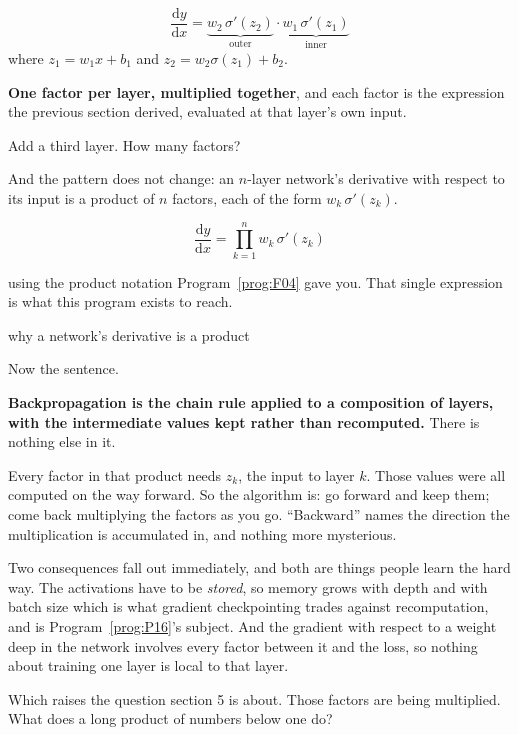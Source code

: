 \begin{fr}
\begin{ansblock}
\[ \frac{\mathrm{d}y}{\mathrm{d}x}
   = \underbrace{w_2\,\sigma'(z_2)}_{\text{outer}} \cdot
     \underbrace{w_1\,\sigma'(z_1)}_{\text{inner}} \]
where $z_1 = w_1x + b_1$ and $z_2 = w_2\sigma(z_1) + b_2$.
\end{ansblock}

\textbf{One factor per layer, multiplied together}, and each factor is the
expression the previous section derived, evaluated at that layer's own input.

Add a third layer. How many factors?
\nextframe
\end{fr}

\begin{fr}
And the pattern does not change: an $n$-layer network's derivative with
respect to its input is a product of $n$ factors, each of the form
$w_k\,\sigma'(z_k)$.

\[ \frac{\mathrm{d}y}{\mathrm{d}x}
   = \prod_{k=1}^{n} w_k\,\sigma'(z_k) \]

using the product notation Program~\ref{prog:F04} gave you. That single
expression is what this program exists to reach.

{why a network's derivative is a product}
\end{fr}

\begin{fr}
Now the sentence.

\begin{aibox}
\textbf{Backpropagation%
 is the chain rule applied to a
composition of layers, with the intermediate values kept rather than
recomputed.} There is nothing else in it.

Every factor in that product needs $z_k$, the input to layer $k$. Those values
were all computed on the way forward. So the algorithm is: go forward and keep
them; come back multiplying the factors as you go. \enquote{Backward} names
the direction the multiplication is accumulated in, and nothing more
mysterious.

Two consequences fall out immediately, and both are things people learn the
hard way. The activations have to be \emph{stored}, so memory grows with depth
and with batch size \dash{} which is what gradient checkpointing trades
against recomputation, and is Program~\ref{prog:P16}'s subject. And the
gradient with respect to a weight deep in the network involves every factor
between it and the loss, so nothing about training one layer is local to that
layer.
\end{aibox}

Which raises the question section 5 is about. Those factors are being
multiplied. What does a long product of numbers below one do?
\nextframe
\end{fr}

